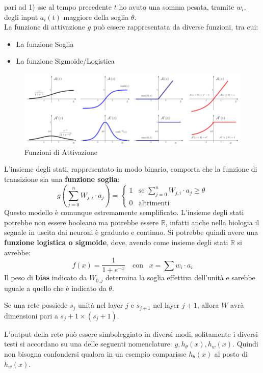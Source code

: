 pari ad 1) sse al tempo precedente $t$ ho avuto una somma pesata, tramite $w_i$,
degli input $a_i(t)$ maggiore della soglia
$\theta$.\\
La funzione di attivazione $g$ può essere rappresentata da diverse funzioni, tra cui:
\begin{itemize}
	\item La funzione Soglia
	\item La funzione Sigmoide/Logistica
\end{itemize}
\begin{figure}[h!]
	\centering
	\includegraphics[width=1\textwidth]{img/Some-of-the-most-common-activation-functions-and-their-first-order-gradient-From-left-to.png}
	\caption{Funzioni di Attivazione}
	\label{ActivationFunction}
\end{figure}
L'insieme degli stati, rappresentato in modo binario, comporta che la funzione
di transizione sia una \textbf{funzione soglia}:
\[g(\sum_{j=0}^n W_{j,i}\cdot a_j)=
	\begin{cases}
		1 & \mbox{se } \sum_{j=0}^n W_{j,i}\cdot a_j\geq \theta \\
		0 & \mbox{altrimenti}                                   
	\end{cases}
\]
Questo modello è comunque estremamente semplificato. L'insieme degli stati
potrebbe non essere booleano ma potrebbe essere $\mathbb{R}$, infatti anche
nella biologia il segnale in uscita dai neuroni è graduato e continuo. Si
potrebbe quindi avere una \textbf{funzione logistica o sigmoide}, dove, avendo
come insieme degli stati $\mathbb{R}$ si avrebbe:
\[f(x)=\frac{1}{1+e^{-x}}\,\,\,\,\mbox{  con } \,\,\, x=\sum w_i\cdot a_i\]
Il peso di \textbf{bias} indicato da $W_{0,j}$ determina la soglia effettiva dell'unità e sarebbe uguale a quello che è indicato da $\theta$.
\begin{definizione}
	Se una rete possiede $s_j$ unità nel layer $j$ e $s_{j+1}$ nel layer $j+1$, allora $W$ avrà dimensioni pari a $s_j+1 \times (s_j + 1)$.
\end{definizione}
L'output della rete può essere simboleggiato in diversi modi, solitamente i diversi testi si accordano su una delle seguenti nomenclature: $y, h_\theta(x), h_w(x)$. Quindi non bisogna confondersi qualora in un esempio comparisse $h_\theta(x)$ al posto di $h_w(x)$.
